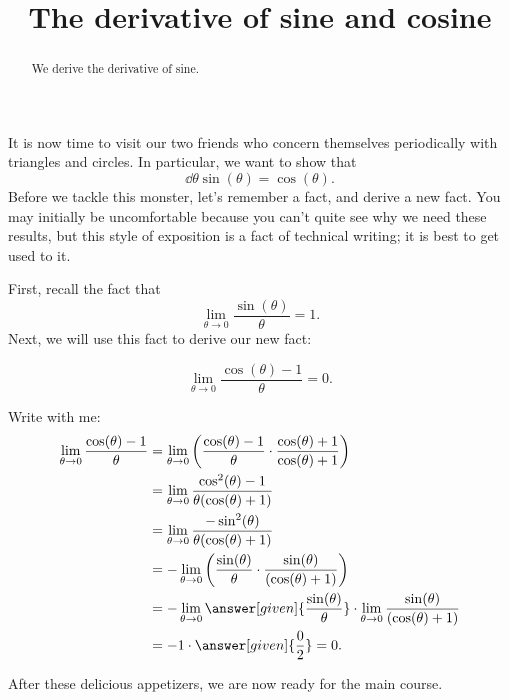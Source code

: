 \documentclass{ximera}
\title[Dig-In:]{The derivative of sine and cosine}
\begin{document}
\begin{abstract}
  We derive the derivative of sine.
\end{abstract}
\maketitle

It is now time to visit our two friends who concern themselves
periodically with triangles and circles. In particular, we want to show that
\[
\dd{\theta}\sin(\theta)=\cos(\theta).
\]
Before we tackle this monster, let's remember a fact, and derive a new
fact. You may initially be uncomfortable because you can't quite see why we need
these results, but this style of exposition is a fact of technical writing; it
is best to get used to it.

First, recall the fact that
\[
\lim_{\theta\to 0} \frac{\sin(\theta)}{\theta} = 1. %
\]
Next, we will use this fact to derive our new fact:
\begin{example}
  \[
\lim_{\theta\to 0}\frac{\cos(\theta)-1}{\theta} = 0.
  \]
  \begin{explanation}
    Write with me:
\begin{align*}
\lim_{\theta\to 0}\frac{\cos(\theta)-1}{\theta} &= \lim_{\theta\to 0}\left(\frac{\cos(\theta)-1}{\theta}\cdot\frac{\cos(\theta)+1}{\cos(\theta)+1}\right)\\
&=\lim_{\theta\to 0}\frac{\cos^2(\theta)-1}{\theta(\cos(\theta)+1)}\\
&=\lim_{\theta\to 0}\frac{-\sin^2(\theta)}{\theta(\cos(\theta)+1)}\\
&=-\lim_{\theta\to 0}\left(\frac{\sin(\theta)}{\theta}\cdot\frac{\sin(\theta)}{(\cos(\theta)+1)}\right)\\
&=-\lim_{\theta\to 0}\answer[given]{\frac{\sin(\theta)}{\theta}} \cdot \lim_{\theta\to 0}\frac{\sin(\theta)}{(\cos(\theta)+1)}\\
&= -1 \cdot \answer[given]{\frac{0}{2}} = 0.
\end{align*}
  \end{explanation}
\end{example}

After these delicious appetizers, we are now ready for the main course.
\end{document}
